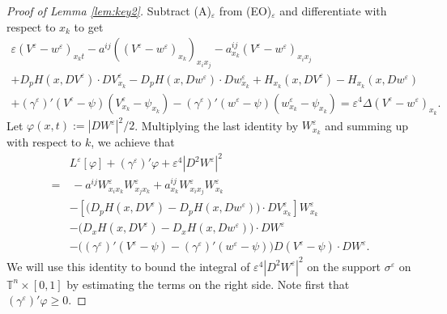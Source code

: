\documentclass[12pt,reqno]{amsart}
\theoremstyle{plain}
\theoremstyle{remark}
\numberwithin{equation}{section}
\begin{document}
\begin{proof}[Proof of Lemma {\rm\ref{lem:key2}}]
Subtract (A)$_{\varepsilon}$ from (EO)$_{\varepsilon}$ and differentiate with respect to $x_k$ to get
\begin{multline*}
{\varepsilon} (V^{\varepsilon}-w^{\varepsilon})_{x_k t} -a^{ij} ( (V^{\varepsilon}-w^{\varepsilon})_{x_k})_{x_i x_j} 
-a^{ij}_{x_k}(V^{\varepsilon}-w^{\varepsilon})_{x_i x_j}\\
+D_p H(x,DV^{\varepsilon})\cdot DV^{\varepsilon}_{x_k} - D_p H(x,Dw^{\varepsilon}) \cdot Dw^{\varepsilon}_{x_k}
+ H_{x_k}(x,DV^{\varepsilon})-H_{x_k}(x,Dw^{\varepsilon})\\
+({\gamma}^{\varepsilon})'(V^{\varepsilon}-\psi)(V^{\varepsilon}_{x_k}-\psi_{x_k})
-({\gamma}^{\varepsilon})'(w^{\varepsilon}-\psi)(w^{\varepsilon}_{x_k}-\psi_{x_k})
= {\varepsilon}^4 {\Delta}(V^{\varepsilon}-w^{\varepsilon})_{x_k}.
\end{multline*}
Let $\varphi(x,t):=|DW^{\varepsilon}|^2/2$. 
Multiplying the last identity by $W^{\varepsilon}_{x_k}$
and summing up with respect to $k$, we achieve that
\begin{align}
&L^{\varepsilon}[\varphi]+({\gamma}^{\varepsilon})' \varphi+{\varepsilon}^4|D^2W^{\varepsilon}|^2\nonumber\\
=&\,
-a^{ij}W^{\varepsilon}_{x_ix_k}W^{\varepsilon}_{x_jx_k}
+a^{ij}_{x_k}W^{\varepsilon}_{x_ix_j}W^{\varepsilon}_{x_k}\nonumber\\
&
-\left[ \Big( D_p H(x,DV^{\varepsilon})-D_p H(x,Dw^{\varepsilon}) \Big) \cdot DV^{\varepsilon}_{x_k} \right]
W^{\varepsilon}_{x_k}\nonumber\\
&-\Big( D_x H(x,DV^{\varepsilon})-D_x H(x,Dw^{\varepsilon}) \Big) \cdot DW^{\varepsilon}
\nonumber\\
&
-\big(({\gamma}^{\varepsilon})'(V^{\varepsilon}-\psi)-({\gamma}^{\varepsilon})'(w^{\varepsilon}-\psi)\big)
D(V^{\varepsilon}-\psi)\cdot DW^{\varepsilon}. \label{eq:subtract}
\end{align}
We will use this identity to bound the integral of 
${\varepsilon}^4|D^2W^{\varepsilon}|^2$ on the support ${\sigma}^{\varepsilon}$ on ${\mathbb{T}}^n\times[0,1]$
by estimating the terms on the right side. Note first that $({\gamma}^{\varepsilon})' \varphi \geq 0$.


\end{proof}
\end{document}
